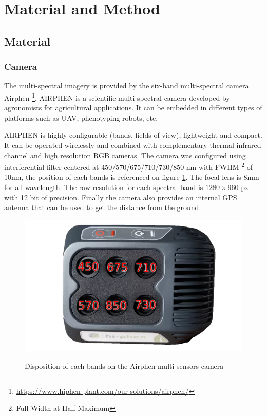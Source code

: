 \documentclass[]{elsarticle}
\begin{document}
	\newpage
	\section{Material and Method}
	
	\subsection{Material}
	\subsubsection{Camera}
	
	The multi-spectral imagery is provided by the six-band multi-spectral camera Airphen \footnote{\url{https://www.hiphen-plant.com/our-solutions/airphen/}}.
	AIRPHEN is a scientific multi-spectral camera developed by agronomists for agricultural applications.
	It can be embedded in different types of platforms such as UAV, phenotyping robots, etc.
	\\
	\par AIRPHEN is highly configurable (bands, fields of view), lightweight and compact.
	It can be operated wirelessly and combined with complementary thermal infrared channel and high resolution RGB cameras.
	The camera was configured using interferential filter centered at 450/570/675/710/730/850 nm with FWHM \footnote{Full Width at Half Maximum} of 10nm, the position of each bands is referenced on figure \ref{fig:bands-disposition}.
	The focal lens is 8mm for all wavelength. The raw resolution for each spectral band is $1280 \times 960$ px with 12 bit of precision.
	Finally the camera also provides an internal GPS antenna that can be used to get the distance from the ground.
	
	\begin{figure}[H]
		\centering
		\includegraphics[width=0.33\linewidth]{../figures/airphen-detail4}
		\label{fig:bands-disposition}
		\caption{Disposition of each bands on the Airphen multi-sensors camera}
	\end{figure}
	
\end{document}
